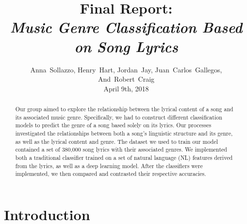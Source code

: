 \documentclass[journal]{IEEEtran}
\begin{document}
\title{Final Report:\\\emph{Music Genre Classification Based on Song Lyrics}}

\author{Anna~Sollazzo,
        Henry~Hart,
        Jordan~Jay,
        Juan~Carlos~Gallegos,
        And~Robert~Craig \\ April 9th, 2018}

\maketitle


\begin{abstract}

Our group aimed to explore the relationship between the lyrical content of a song and its associated music genre. Specifically, we had to construct different classification models to predict the genre of a song based solely on its lyrics. Our processes investigated the relationships between both a song's linguistic structure and its genre, as well as the lyrical content and genre. The dataset we used to train our model contained a set of 380,000 song lyrics with their associated genres. We implemented both a traditional classifier trained on a set of natural language (NL) features derived from the lyrics, as well as a deep learning model. After the classifiers were implemented, we then compared and contrasted their respective accuracies.\par

\end{abstract}

\section{Introduction}
\end{document}
